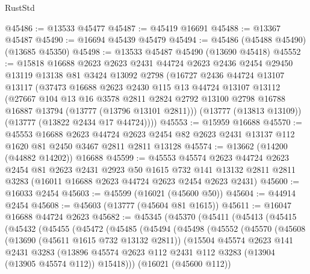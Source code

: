 \begin{lexlean}{RustStd}
\begin{coremodule}
@45486 := @13533 @45477
@45487 := @45419 @16691
@45488 := @13367 @45487
@45490 := @16694 @45439 @45479
@45494 := @45486 (@45488 @45490) (@13685 @45350)
@45498 := @13533 @45487 @45490 (@13690 @45418)
@45552 := @15818
    @16688
    @2623
    @2623
    @2431
    @44724
    @2623
    @2436
    @2454
    @29450
    @13119
    @13138
    @81
    @3424
    @13092
    @2798
    (@16727
      @2436
      @44724
      @13107
      @13117
      (@37473
        @16688
        @2623
        @2430
        @115
        @13
        @44724
        @13107
        @13112
        (@27667
          @104
          @13
          @16
          @3578
          @2811
          @2824
          @2792
          @13100
          @2798
          @16788
          @16887
          @13794
          (@13777 (@13796 @13101 @2811)))
        (@13777 (@13813 @13109))
        (@13777 (@13822 @2434 @17 @44724))))
@45553 := @15959 @16688
@45570 := @45553
    @16688
    @2623
    @44724
    @2623
    @2454
    @82
    @2623
    @2431
    @13137
    @112
    @1620
    @81
    @2450
    @3467
    @2811
    @2811
    @13128
@45574 := @13662 (@14200 (@44882 @14202)) @16688
@45599 := @45553
    @45574
    @2623
    @44724
    @2623
    @2454
    @81
    @2623
    @2431
    @2923
    @50
    @1615
    @732
    @141
    @13132
    @2811
    @2811
    @3283
    (@16011 @16688 @2623 @44724 @2623 @2454 @2623 @2431)
@45600 := @16033 @2454
@45603 := @45599 (@16021 (@45600 @50))
@45604 := @44914 @2454
@45608 := @45603 (@13777 (@45604 @81 @1615))
@45611 := @16047 @16688 @44724 @2623
@45682 := @45345
    (@45370
      (@45411
        (@45413
          (@45415
            (@45432
              (@45455
                (@45472
                  (@45485
                    (@45494
                      (@45498
                        (@45552
                          (@45570
                            (@45608
                              (@13690 (@45611 @1615 @732 @13132 @2811))
                              (@15504
                                @45574
                                @2623
                                @141
                                @2431
                                @3283
                                (@13896
                                  @45574
                                  @2623
                                  @112
                                  @2431
                                  @112
                                  @3283
                                  (@13904 (@13905 @45574 @112))
                                  @15418)))
                            (@16021 (@45600 @112))

\end{coremodule}
\end{lexlean}
